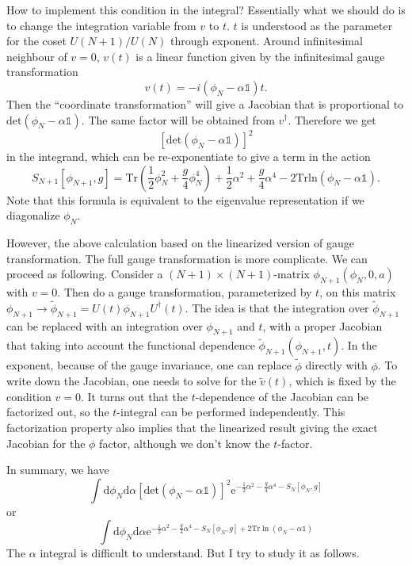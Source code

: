 How to implement this condition in the integral?
Essentially what we should do is to change the integration variable from $v$ to $t$.
$t$ is understood as the parameter for the coset $U(N+1)/U(N)$ through exponent.
Around infinitesimal neighbour of $v=0$, $v(t)$ is a linear function given by the infinitesimal gauge transformation
\[
	v(t) = - i (\phi_N -\alpha \mathds{1})t
.\] 
Then the ``coordinate transformation'' will give a Jacobian that is proportional to $\mathrm{det} (\phi_N - \alpha \mathds{1})$.
The same factor will be obtained from $v^\dagger$.
Therefore we get
\[\left[\mathrm{det}(\phi_N - \alpha \mathds{1})\right]^2\]
in the integrand, which can be re-exponentiate to give a term in the action
\begin{equation}
    S_{N+1}[\phi_{N+1},g] = \mathrm{Tr}\left( \frac{1}{2}\phi_N^2+\frac{g}{4}\phi_N^4\right) + \frac{1}{2}\alpha^2 +  \frac{g}{4}\alpha^4 - 2 \mathrm{Tr} \mathrm{ln}(\phi_N - \alpha \mathds{1}).
\end{equation}
Note that this formula is equivalent to the eigenvalue representation if we diagonalize $\phi_N$.

However, the above calculation based on the linearized version of gauge transformation.
The full gauge transformation is more complicate.
We can proceed as following.
Consider a $(N+1)\times (N+1)$-matrix $\phi_{N+1}(\phi_N,0,a)$ with $v=0$.
Then do a gauge transformation, parameterized by $t$, on this matrix $\phi_{N+1}\to \tilde{\phi}_{N+1} = U(t) \phi_{N+1} U^\dagger(t)$.
The idea is that the integration over $\tilde{\phi}_{N+1}$ can be replaced with an integration over $\phi_{N+1}$ and $t$,
with a proper Jacobian that taking into account the functional dependence $\tilde{\phi}_{N+1}(\phi_{N+1},t)$.
In the exponent, because of the gauge invariance, one can replace $\tilde{\phi}$ directly with $\phi$.
To write down the Jacobian, one needs to solve for the $\tilde{v}(t)$, which is fixed by the condition $v=0$.
It turns out that the $t$-dependence of the Jacobian can be factorized out, so the $t$-integral can be performed independently.
This factorization property also implies that the linearized result giving the exact Jacobian for the $\phi$ factor,
although we don't know the $t$-factor.

In summary, we have
\begin{equation}
	\int \mathrm{d}\phi_N \mathrm{d}\alpha  [\mathrm{det}(\phi_N-\alpha\mathds{1})]^2 \mathrm{e}^{-\frac{1}{2}\alpha^2 - \frac{g}{4}\alpha^4-S_N[\phi_N,g]}
\end{equation}
or
\begin{equation}
	\int \mathrm{d} \phi_N \mathrm{d}\alpha \mathrm{e}^{-\frac{1}{2} \alpha^2 - \frac{g}{4}\alpha^4 - S_N[\phi_N,g] + 2 \mathrm{Tr}\ln (\phi_N - \alpha \mathds{1})} 
\end{equation}
The $\alpha$ integral is difficult to understand.
But I try to study it as follows.

